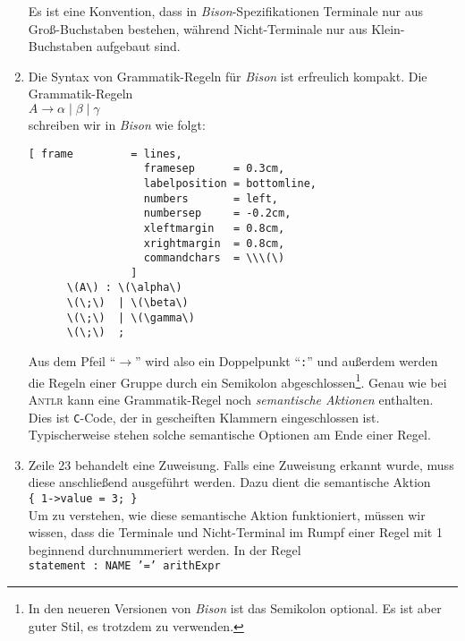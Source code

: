 \begin{enumerate}
      Es ist eine Konvention, dass in \textsl{Bison}-Spezifikationen Terminale nur aus
      Gro{\ss}-Buchstaben bestehen, w\"ahrend Nicht-Terminale nur aus Klein-Buchstaben aufgebaut
      sind.
\item Die Syntax von Grammatik-Regeln f\"ur \textsl{Bison} ist erfreulich kompakt.
      Die Grammatik-Regeln 
      \\[0.2cm]
      \hspace*{1.3cm}
      $A \rightarrow \alpha \mid \beta \mid \gamma$
      \\[0.2cm]
      schreiben wir in \textsl{Bison} wie folgt:
      \begin{Verbatim}[ frame         = lines, 
                  framesep      = 0.3cm, 
                  labelposition = bottomline,
                  numbers       = left,
                  numbersep     = -0.2cm,
                  xleftmargin   = 0.8cm,
                  xrightmargin  = 0.8cm,
                  commandchars  = \\\(\)
                ]
      \(A\) : \(\alpha\)
      \(\;\)  | \(\beta\)
      \(\;\)  | \(\gamma\)
      \(\;\)  ;
      \end{Verbatim}
      Aus dem Pfeil ``$\rightarrow$'' wird also ein Doppelpunkt ``\texttt{:}'' und au{\ss}erdem
      werden die Regeln einer Gruppe durch ein Semikolon abgeschlossen\footnote{
        In den neueren Versionen von \textsl{Bison} ist das Semikolon optional.
        Es ist aber guter Stil, es trotzdem zu verwenden.}.
      Genau wie bei \textsc{Antlr} kann eine Grammatik-Regel noch \emph{semantische Aktionen}
      enthalten.  Dies ist \texttt{C}-Code, der in gescheiften Klammern eingeschlossen
      ist.  Typischerweise stehen solche semantische Optionen am Ende einer Regel.
\item Zeile 23 behandelt eine Zuweisung.  Falls eine Zuweisung erkannt wurde, muss diese
      anschlie{\ss}end ausgef\"uhrt werden.  Dazu dient die semantische Aktion
      \\[0.2cm]
      \hspace*{1.3cm}
      \texttt{\{ 1->value = 3; \}}
      \\[0.2cm]
      Um zu verstehen, wie diese semantische Aktion funktioniert, m\"ussen wir wissen, dass die
      Terminale und Nicht-Terminal im Rumpf einer Regel mit 1 beginnend durchnummeriert
      werden.  In der Regel
      \\[0.2cm]
      \hspace*{1.3cm}
      \texttt{statement : NAME '=' arithExpr}

\end{enumerate}
